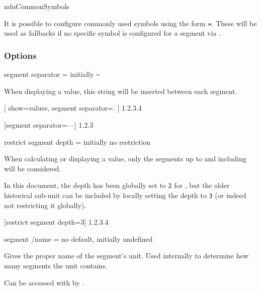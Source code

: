 \documentclass{article}
\begin{document}
\begin{docCommand}
	{nduCommonSymbols}
	{}

	It is possible to configure commonly used symbols using the form \texttt{=}. These will be used as fallbacks if no specific symbol is configured for a segment via .

\end{docCommand}

\subsubsection{Options}

\begin{docKey}
	{segment separator}
	{=}
	{initially \texttt{\~{}}}
	
	When displaying a value, this string will be inserted between each segment.

\begin{dispExample}
[
		show=values,
		segment separator=.
	]
	{1.2.3.4}

	[segment separator={---}]
	{1.2.3}
\end{dispExample}

\end{docKey}

\begin{docKey}
	{restrict segment depth}
	{=}
	{initially no restriction}
	
	When calculating or displaying a value, only the segments up to and including  will be considered.
	
	In this document, the depth has been globally set to \texttt{2} for , but the older historical sub-unit  can be included by locally setting the depth to \texttt{3} (or indeed not restricting it globally).
	
\begin{dispExample}
	[restrict segment depth=3]
	{1.2.3.4}
\end{dispExample}
\end{docKey}

\begin{docKey}
	[]
	[doc label=segment:name]
	{segment /name}
	{=}
	{no default, initially undefined}

	Gives the proper name of the segment's unit. Used internally to determine how many segments the unit contains.
	
	Can be accessed with by .
\end{docKey}
\end{document}
